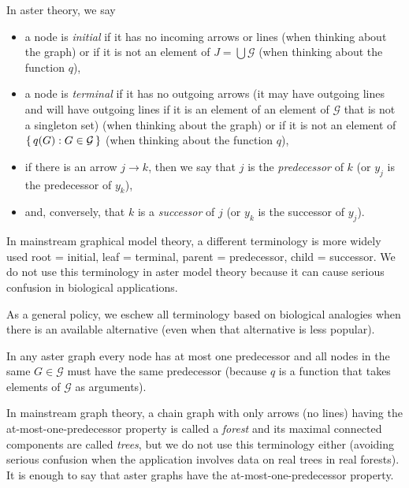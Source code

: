 In aster theory, we say
\begin{itemize}
\item a node is \emph{initial} if it has no incoming arrows
    or lines (when thinking about the graph) or if it is not an element
    of $J = \bigcup \mathcal{G}$ (when thinking about the function $q$),
\item a node is \emph{terminal} if it has no outgoing arrows
    (it may have outgoing lines and will have outgoing lines if it is
    an element of an element of $\mathcal{G}$ that is not a singleton set)
    (when thinking about the graph) or if it is not an element
    of $\{\,  q(G) : G \in \mathcal{G}  \,\}$
    (when thinking about the function $q$),
\item if there is an arrow $j \longrightarrow k$, then we say that $j$
    is the \emph{predecessor} of $k$ (or $y_j$ is the predecessor of $y_k$),
\item and, conversely, that $k$ is a \emph{successor} of $j$
    (or $y_k$ is the successor of $y_j$).
\end{itemize}

In mainstream graphical model theory, a different terminology is more widely
used \citep{lauritzen} root = initial, leaf = terminal, parent = predecessor,
child = successor.  We do not use this terminology in aster model theory
because it can cause serious confusion in biological applications.

As a general policy, we eschew all terminology based on biological analogies
when there is an available alternative (even when that alternative is less
popular).

In any aster graph every node has at most one predecessor and all nodes in
the same $G \in \mathcal{G}$ must have the same predecessor (because $q$
is a function that takes elements of $\mathcal{G}$ as arguments).

In mainstream graph theory, a chain graph with only arrows (no lines) having
the at-most-one-predecessor property is called a \emph{forest} and its maximal
connected components are called \emph{trees}, but we do not use this terminology
either (avoiding serious confusion when the application involves data on
real trees in real forests).  It is enough to say that aster graphs
have the at-most-one-predecessor property.

